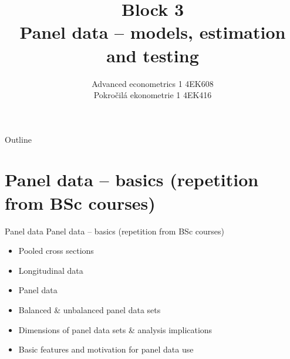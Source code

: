 \documentclass[usenames,dvipsnames]{beamer}
\title[Block 3]{Block 3 \\  Panel data -- models, estimation and testing }
\author{Advanced econometrics 1 4EK608 \\Pokročilá ekonometrie 1 4EK416}
\institute{Vysoká škola ekonomická v Praze}
\date{}
\begin{document}
 
\begin{frame}
  \titlepage
\end{frame}

\begin{frame}{Outline}
  \tableofcontents
\end{frame}
%
\section{Panel data -- basics (repetition from BSc courses)}
\begin{frame}{Panel data}
Panel data -- basics (repetition from BSc courses) \\ \bigskip
\begin{itemize}
\item Pooled cross sections
\bigskip
\item Longitudinal data
\bigskip
\item Panel data
\bigskip
\item Balanced \& unbalanced panel data sets
\bigskip
\item Dimensions of panel data sets \& analysis implications
\bigskip
\item Basic features and motivation for panel data use
\end{itemize}
\end{frame}
\end{document}
